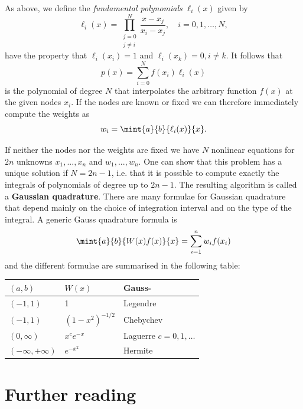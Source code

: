As above, we define the \textit{fundamental polynomials}
$\ell_i(x)$ given by
%
\begin{equation}
  \ell_i(x) = \prod_{\substack{j = 0\\j \ne i}}^N \frac{x - x_j}{x_i -
    x_j}, \quad i = 0, 1, \dots, N,
\end{equation}
%
have the property that $\ell_i(x_i) = 1$ and $\ell_i(x_k) = 0, i \ne
k$. It follows that
%
\begin{equation}
  p(x) = \sum_{i=0}^N f(x_i) \ell_i(x)
\end{equation}
%
is the polynomial of degree $N$ that interpolates the arbitrary
function $f(x)$ at the given nodes $x_i$. If the nodes are known or
fixed we can therefore immediately compute the weights as
%
\begin{equation}
  w_i = \mint{a}{b}{\ell_i(x)}{x}.
\end{equation}
%

If neither the nodes nor the weights are fixed we have $N$ nonlinear
equations for $2n$ unknowns $x_1,...,x_n$ and $w_1,...,w_n$.  One can
show that this problem has a unique solution if $N=2n-1$, i.e. that it
is possible to compute exactly the integrals of polynomials of degree
up to $2 n - 1$.  The resulting algorithm is called a {\bf Gaussian
  quadrature}.  There are many formulae for Gaussian quadrature that
depend mainly on the choice of integration interval and on the type of
the integral.  A generic Gauss quadrature formula is
%
\begin{equation}
  \mint{a}{b}{W(x) f(x)}{x} = \sum_{i=1}^n w_i f(x_i)
\end{equation}
%
and the different formulae are summarised in the following table:

\begin{center}
 \begin{tabular}{lll} \hline
  $(a,b)$ & $W(x)$ & Gauss- \\ \hline
  $(-1,1)$ & 1 & Legendre \\
  $(-1,1)$ & $(1-x^2)^{-1/2}$ & Chebychev \\
  $(0,\infty)$ & $x^c e^{-x}$ & Laguerre $c=0,1,\ldots$ \\
  $(-\infty,+\infty)$ & $e^{-x^2}$ & Hermite \\ \hline
 \end{tabular}
\end{center}

\section*{Further reading}

